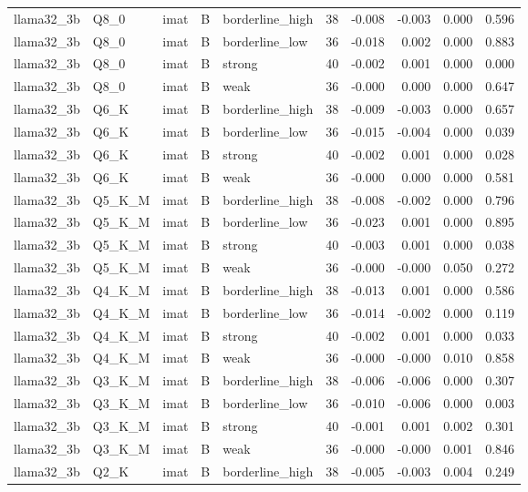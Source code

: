 \begin{tabular}{lllllrrrrr}
llama32\_3b & Q8\_0 & imat & B & borderline\_high & 38 & -0.008 & -0.003 & 0.000 & 0.596 \\
llama32\_3b & Q8\_0 & imat & B & borderline\_low & 36 & -0.018 & 0.002 & 0.000 & 0.883 \\
llama32\_3b & Q8\_0 & imat & B & strong & 40 & -0.002 & 0.001 & 0.000 & 0.000 \\
llama32\_3b & Q8\_0 & imat & B & weak & 36 & -0.000 & 0.000 & 0.000 & 0.647 \\
llama32\_3b & Q6\_K & imat & B & borderline\_high & 38 & -0.009 & -0.003 & 0.000 & 0.657 \\
llama32\_3b & Q6\_K & imat & B & borderline\_low & 36 & -0.015 & -0.004 & 0.000 & 0.039 \\
llama32\_3b & Q6\_K & imat & B & strong & 40 & -0.002 & 0.001 & 0.000 & 0.028 \\
llama32\_3b & Q6\_K & imat & B & weak & 36 & -0.000 & 0.000 & 0.000 & 0.581 \\
llama32\_3b & Q5\_K\_M & imat & B & borderline\_high & 38 & -0.008 & -0.002 & 0.000 & 0.796 \\
llama32\_3b & Q5\_K\_M & imat & B & borderline\_low & 36 & -0.023 & 0.001 & 0.000 & 0.895 \\
llama32\_3b & Q5\_K\_M & imat & B & strong & 40 & -0.003 & 0.001 & 0.000 & 0.038 \\
llama32\_3b & Q5\_K\_M & imat & B & weak & 36 & -0.000 & -0.000 & 0.050 & 0.272 \\
llama32\_3b & Q4\_K\_M & imat & B & borderline\_high & 38 & -0.013 & 0.001 & 0.000 & 0.586 \\
llama32\_3b & Q4\_K\_M & imat & B & borderline\_low & 36 & -0.014 & -0.002 & 0.000 & 0.119 \\
llama32\_3b & Q4\_K\_M & imat & B & strong & 40 & -0.002 & 0.001 & 0.000 & 0.033 \\
llama32\_3b & Q4\_K\_M & imat & B & weak & 36 & -0.000 & -0.000 & 0.010 & 0.858 \\
llama32\_3b & Q3\_K\_M & imat & B & borderline\_high & 38 & -0.006 & -0.006 & 0.000 & 0.307 \\
llama32\_3b & Q3\_K\_M & imat & B & borderline\_low & 36 & -0.010 & -0.006 & 0.000 & 0.003 \\
llama32\_3b & Q3\_K\_M & imat & B & strong & 40 & -0.001 & 0.001 & 0.002 & 0.301 \\
llama32\_3b & Q3\_K\_M & imat & B & weak & 36 & -0.000 & -0.000 & 0.001 & 0.846 \\
llama32\_3b & Q2\_K & imat & B & borderline\_high & 38 & -0.005 & -0.003 & 0.004 & 0.249 \\

\end{tabular}
